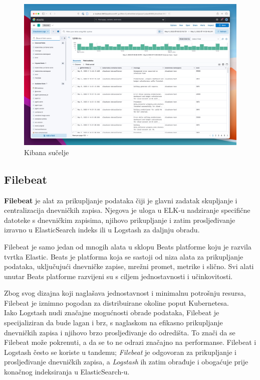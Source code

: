 \documentclass[times, utf8, diplomski]{fer}
\begin{document}
\begin{figure}[htb]
	\centering
	\includegraphics[width=15cm]{images/elastic-logs.jpeg}
	\caption[Kibana sučelje]{Kibana sučelje}
	\label{fig:kibana}
\end{figure}

\subsection{Filebeat}
\label{sec:filebeat}

\textbf{Filebeat} je alat za prikupljanje podataka čiji je glavni zadatak skupljanje i centralizacija dnevničkih zapisa. Njegova je uloga u ELK-u nadziranje specifične datoteke s dnevničkim zapisima, njihovo prikupljanje i zatim prosljeđivanje izravno u ElasticSearch indeks ili u Logstash za daljnju obradu. 

Filebeat je samo jedan od mnogih alata u sklopu Beats platforme koju je razvila tvrtka Elastic. Beats je platforma koja se sastoji od niza alata za prikupljanje podataka, uključujući dnevničke zapise, mrežni promet, metrike i slično. Svi alati unutar Beats platforme razvijeni su s ciljem jednostavnosti i učinkovitosti. 

Zbog svog dizajna koji naglašava jednostavnost i minimalnu potrošnju resursa, Filebeat je iznimno pogodan za distribuirane okoline poput Kubernetesa.\\

Iako Logstash nudi značajne mogućnosti obrade podataka, Filebeat je specijaliziran da bude lagan i brz, s naglaskom na efikasno prikupljanje dnevničkih zapisa i njihovo brzo prosljeđivanje do odredišta. To znači da se Filebeat može pokrenuti, a da se to ne odrazi značajno na performanse. Filebeat i Logstash često se koriste u tandemu; \emph{Filebeat} je odgovoran za prikupljanje i prosljeđivanje dnevničkih zapisa, a \emph{Logstash} ih zatim obrađuje i obogaćuje prije konačnog indeksiranja u ElasticSearch-u.\\
\end{document}
